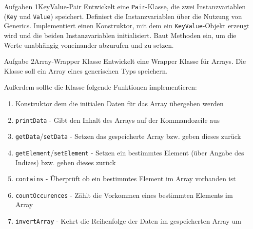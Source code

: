 \begin{frame}{Aufgaben 1}{KeyValue-Pair}
    Entwickelt eine \texttt{Pair}-Klasse, die zwei Instanzvariablen (\texttt{Key} und \texttt{Value}) speichert. Definiert die Instanzvariablen über die Nutzung von Generics.
    Implementiert einen Konstruktor, mit dem ein \texttt{KeyValue}-Objekt erzeugt wird und die beiden Instanzvariablen initialisiert. Baut Methoden ein, um die Werte unabhängig voneinander abzurufen und zu setzen.
\end{frame}
    
\begin{frame}[allowframebreaks]{Aufgabe 2}{Array-Wrapper Klasse}    
    Entwickelt eine Wrapper Klasse für Arrays. Die Klasse soll ein Array eines generischen Typs speichern.
    
    Außerdem sollte die Klasse folgende Funktionen implementieren:
    \begin{enumerate}
        \item Konstruktor dem die initialen Daten für das Array übergeben werden
        \item \texttt{printData} - Gibt den Inhalt des Arrays auf der Kommandozeile aus
        \item \texttt{getData}/\texttt{setData} - Setzen das gespeicherte Array bzw. geben dieses zurück
        \item \texttt{getElement}/\texttt{setElement} - Setzen ein bestimmtes Element (über Angabe des Indizes) bzw. geben dieses zurück
        \item \texttt{contains} - Überprüft ob ein bestimmtes Element im Array vorhanden ist
        \item \texttt{countOccurences} - Zählt die Vorkommen eines bestimmten Elements im Array
        \item \texttt{invertArray} - Kehrt die Reihenfolge der Daten im gespeicherten Array um
    \end{enumerate}
\end{frame}

